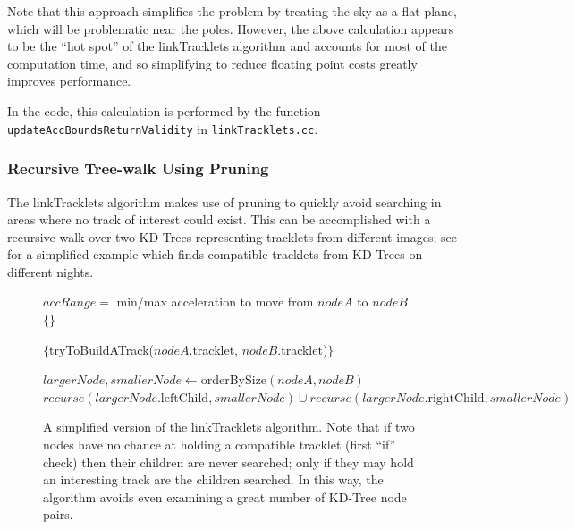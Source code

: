 Note that this approach simplifies the problem by treating the sky as
a flat plane, which will be problematic near the poles.  However, the
above calculation appears to be the ``hot spot'' of the linkTracklets
algorithm and accounts for most of the computation time, and so
simplifying to reduce floating point costs greatly improves
performance.

In the code, this calculation is performed by the function {\tt
  updateAccBoundsReturnValidity} in {\tt linkTracklets.cc}.

\subsubsection{Recursive Tree-walk Using Pruning}

The linkTracklets algorithm makes use of pruning to quickly avoid
searching in areas where no track of interest could exist.  This can
be accomplished with a recursive walk over two KD-Trees representing
tracklets from different images; see 
for a simplified example which finds compatible tracklets from
KD-Trees on different nights.

\begin{figure}[ht!]
\begin{algorithmic}


\STATE $accRange = $ min/max acceleration to move from $nodeA$ to $nodeB$
    \RETURN $\{\}$
  \ELSE

    \STATE {}

       \RETURN $\{$tryToBuildATrack($nodeA$.tracklet, $nodeB$.tracklet)$\}$
    \ELSE

       \STATE {}

       \STATE $largerNode, smallerNode \gets $orderBySize$(nodeA, nodeB)$
       \RETURN $recurse(largerNode.\text{leftChild}, smallerNode) \cup recurse(largerNode.\text{rightChild}, smallerNode)$
  \ENDIF
\ENDIF

\end{algorithmic}
\caption{A simplified version of the linkTracklets algorithm.  Note
  that if two nodes have no chance at holding a compatible tracklet
  (first ``if'' check) then their children are never searched; only if
  they may hold an interesting track are the children searched.  In
  this way, the algorithm avoids even examining a great number of
  KD-Tree node pairs.}

 \label{simplifiedLinkTracklets}
\end{figure}


